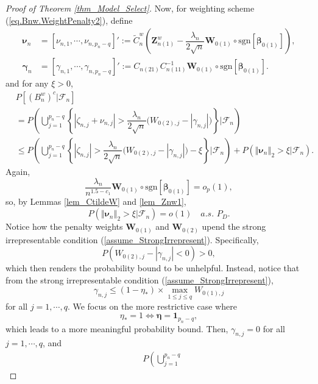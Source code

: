 \documentclass[ejs,authoryear,linksfromyear]{imsart}
\newcommand{\znwa}{\bm{Z}_{n(1)}^w}
\numberwithin{equation}{section}
\theoremstyle{plain}
\begin{document}
\begin{proof}[Proof of Theorem \ref{thm_Model_Select}]
	Now, for weighting scheme (\ref{eq.Bnw.WeightPenalty2}), define 
	\begin{align*}
	\bm{\nu}_n
	&=\left[
		\nu_{n,1}, \cdots, \nu_{n,p_n-q}
	\right]' 
	:= \widetilde{C}^w_n 
	\left(
		\znwa - 
		\dfrac{\lambda_n}{2 \sqrt{n}} 
		\bm{W}_{0(1)} \circ
		\text{sgn} \left[ \bm{\beta}_{0(1)} \right]
	\right), \\
	\bm{\gamma}_n
	&= \left[
		\gamma_{n,1}, \cdots, \gamma_{n,p_n-q}
	\right]' 
	:= C_{n(21)} C_{n(11)}^{-1} 
	\bm{W}_{0(1)} \circ
	\text{sgn} \left[ \bm{\beta}_{0(1)} \right].
	\end{align*}
	and for any $\xi > 0$,
	\begin{align*}
	& P \left[ 
	\left( B_n^w \right)^c \big| \mathcal{F}_n 
	\right] \\
	&= P \left(
		\bigcup_{j=1}^{p_n - q}
		\left\{
			\left\vert
				\zeta_{n,j} + \nu_{n,j}
			\right\vert
			> \dfrac{\lambda_n}{2 \sqrt{n}} 
			\Big(
				W_{0(2),j} - | \gamma_{n,j} |
			\Big)
		\right\}
		\Bigg| \mathcal{F}_n
	\right) \\
	&\leq P \left(
	\bigcup_{j=1}^{p_n - q}
	\left\{
	\left\vert \zeta_{n,j} \right\vert
	> \dfrac{\lambda_n }{2 \sqrt{n}} 
	\Big(
	W_{0(2),j} - | \gamma_{n,j} |
	\Big)
	- \xi
	\right\}
	\Bigg| \mathcal{F}_n
	\right) 
	+ P \left(
	\left\Vert \bm{\nu}_n \right\Vert_2
	> \xi 
	\Big| \mathcal{F}_n
	\right).
	\end{align*}
	Again,
	$$
	\dfrac{\lambda_n}{n^{1.5-c_1}} 
	\bm{W}_{0(1)} \circ
	\text{sgn} \left[ \bm{\beta}_{0(1)} \right]
	= o_p(1),
	$$
	so, by Lemmas \ref{lem_CtildeW} and \ref{lem_Znw1},
	$$
	P \left(
	\left\Vert \bm{\nu}_n \right\Vert_2
	> \xi 
	\Big| \mathcal{F}_n
	\right)
	= o(1) \quad a.s. \,\, P_D.
	$$
	Notice how the penalty weights $\bm{W}_{0(1)}$ and $\bm{W}_{0(2)}$ upend the strong irrepresentable condition (\ref{assume_StrongIrrepresent}). Specifically, 
	$$
	P \left(
		W_{0(2),j} - | \gamma_{n,j} |
		< 0
	\right)
	> 0,
	$$
	which then renders the probability bound to be unhelpful. Instead, notice that from the strong irrepresentable condition (\ref{assume_StrongIrrepresent}),
	$$
	\gamma_{n,j} \leq 
	(1 - \eta_*)
	\times
	\max_{1 \leq j \leq q} W_{0(1), j}
	$$ 
	for all $j= 1, \cdots, q$. We focus on the more restrictive case where 
	$$
	\eta_* = 1 \Longleftrightarrow \bm{\eta} = \bm{1}_{p_n-q},
	$$  
	which leads to a more meaningful probability bound. Then, $\gamma_{n,j} = 0$ for all $j= 1, \cdots, q$, and 
	\begin{align*}
	&P \left(
		\bigcup_{j=1}^{p_n - q}

\end{align*}
\end{proof}
\end{document}
